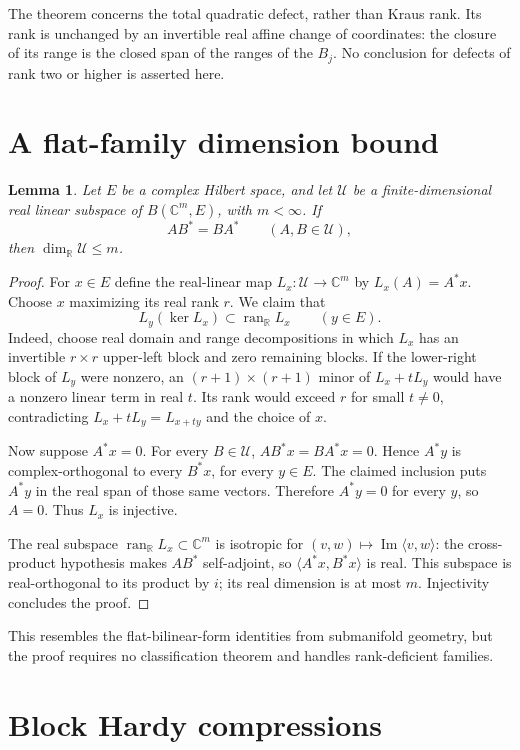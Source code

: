 \documentclass[11pt,letterpaper]{amsart}
\newtheorem{lemma}[theorem]{Lemma}
\theoremstyle{definition}
\theoremstyle{remark}
\numberwithin{equation}{section}
\DeclareMathOperator{\ran}{ran}
\newcommand{\R}{\mathbb R}
\newcommand{\C}{\mathbb C}
\begin{document}
The theorem concerns the total quadratic defect, rather than Kraus
rank. Its rank is unchanged by an invertible real affine change of
coordinates: the closure of its range is the closed span of the
ranges of the $B_j$. No conclusion for defects of rank two or higher
is asserted here.
\section{A flat-family dimension bound}

\begin{lemma}\label{new:flat}
Let $E$ be a complex Hilbert space, and let $\mathcal U$ be a
finite-dimensional real linear subspace of $B(\C^m,E)$, with $m<\infty$.
If
\[
                         AB^*=BA^*\qquad(A,B\in\mathcal U),
\]
then $\dim_{\R}\mathcal U\le m$.
\end{lemma}
\begin{proof}
For $x\in E$ define the real-linear map
$L_x:\mathcal U\to\C^m$ by $L_x(A)=A^*x$. Choose $x$ maximizing its
real rank $r$. We claim that
\[
                     L_y(\ker L_x)\subset\ran_{\R}L_x
                         \qquad(y\in E).
\]
Indeed, choose real domain and range decompositions in which $L_x$ has
an invertible $r\times r$ upper-left block and zero remaining blocks.
If the lower-right block of $L_y$ were nonzero, an
$(r+1)\times(r+1)$ minor of $L_x+tL_y$ would have a nonzero linear term
in real $t$. Its rank would exceed $r$ for small $t\ne0$, contradicting
$L_x+tL_y=L_{x+ty}$ and the choice of $x$.

Now suppose $A^*x=0$. For every $B\in\mathcal U$,
$AB^*x=BA^*x=0$. Hence $A^*y$ is complex-orthogonal to every $B^*x$,
for every $y\in E$. The claimed inclusion puts $A^*y$ in the real span
of those same vectors. Therefore $A^*y=0$ for every $y$, so $A=0$.
Thus $L_x$ is injective.

The real subspace $\ran_{\R}L_x\subset\C^m$ is isotropic for
$(v,w)\mapsto\operatorname{Im}\langle v,w\rangle$: the cross-product
hypothesis makes $AB^*$ self-adjoint, so
$\langle A^*x,B^*x\rangle$ is real. This subspace is real-orthogonal to
its product by $i$; its real dimension is at most $m$. Injectivity
concludes the proof.
\end{proof}

This resembles the flat-bilinear-form identities from submanifold
geometry, but the proof requires no classification theorem and handles
rank-deficient families.

\section{Block Hardy compressions}
\end{document}
